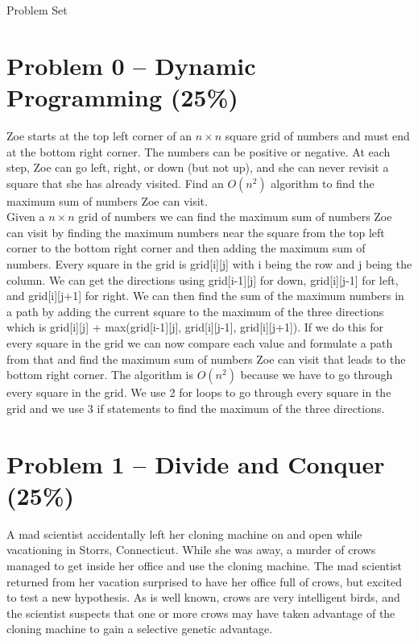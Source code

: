 \documentclass[12pt,letterpaper]{article}
\begin{document}
\begin{center}
    \LARGE Problem Set
\end{center}


\section*{Problem 0 -- Dynamic Programming (25\%)}
Zoe starts at the top left corner of an $n \times n$ square grid of numbers and must end at the bottom right corner.
The numbers can be positive or negative. 
At each step, Zoe can go left, right, or down (but not up), and she can never revisit a square that she has already visited. 
Find an $O(n^2)$ algorithm to find the maximum sum of numbers Zoe can visit.\\

Given a $n \times n$ grid of numbers we can find the maximum sum of numbers Zoe can visit by finding 
the maximum numbers near the square from the top left corner to the bottom right corner and then adding the maximum sum of numbers.
Every square in the grid is grid[i][j] with i being the row and j being the column.
We can get the directions using grid[i-1][j] for down, grid[i][j-1] for left, and grid[i][j+1] for right.
We can then find the sum of the maximum numbers in a path by adding the current square to the maximum of the three directions
which is grid[i][j] + max(grid[i-1][j], grid[i][j-1], grid[i][j+1]). 
If we do this for every square in the grid we can now compare each value and formulate a path from that and find the maximum sum of numbers Zoe can visit that leads to the bottom right corner.
The algorithm is $O(n^2)$ because we have to go through every square in the grid.
We use 2 for loops to go through every square in the grid and we use 3 if statements to find the maximum of the three directions.

\newpage

\section*{Problem 1 -- Divide and Conquer (25\%)}
A mad scientist accidentally left her cloning machine on and open while vacationing in Storrs, Connecticut.
While she was away, a murder of crows managed to get inside her office and use the cloning machine.
The mad scientist returned from her vacation surprised to have her office full of crows, but excited to test a new hypothesis.
As is well known, crows are very intelligent birds, and the scientist suspects that one or more crows may have taken advantage of the cloning machine to gain a selective genetic advantage.
\end{document}
